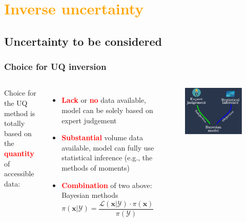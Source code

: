 
\section{\textcolor{orange}{Inverse uncertainty}}
\subsection{Uncertainty to be considered}

\begin{frame}
\frametitle{Choice for UQ inversion}
\begin{columns}
        Choice for the UQ method is totally based on the {\textcolor{red}{\textbf{quantity}}} of accessible data:
        \begin{itemize}
            \item  {\textcolor{red}{\textbf{Lack}}} or {\textcolor{red}{\textbf{no}}} data available, model can be solely based on expert judgement
            \item {\textcolor{red}{\textbf{Substantial}}} volume data available, model can fully use statistical inference (e.g., the methods of moments)
            \item {\textcolor{red}{\textbf{Combination}}} of two above: Bayesian methods
            \begin{equation*}           \pi(\boldsymbol{x}|\mathcal{Y}) = \frac{{\mathcal{L}(\boldsymbol{x}|\mathcal{Y}) \cdot \pi(\boldsymbol{x})}}{{\pi(\mathcal{Y})}} 
            \end{equation*}
        \end{itemize}
    
        \begin{figure}[!ht]       \includegraphics[scale=0.6]{figures/figure_objvssub.pdf}
        \end{figure}
\end{columns}
    
\end{frame}
